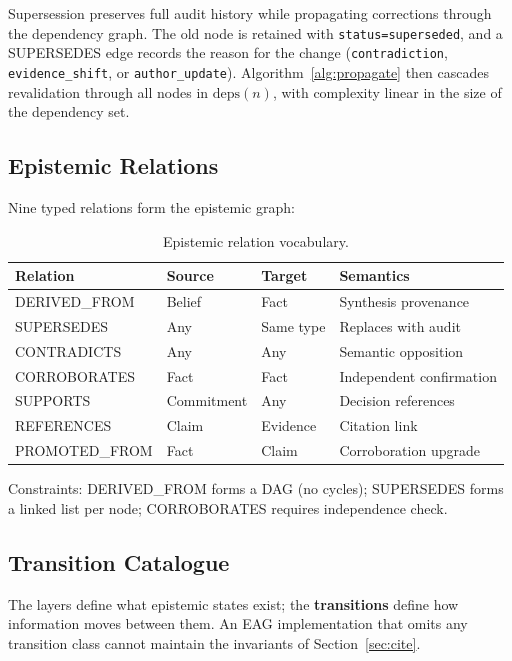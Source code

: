 \documentclass[11pt,letterpaper]{article}
\begin{document}
Supersession preserves full audit history while propagating corrections through the dependency graph. The old node is retained with \texttt{status=superseded}, and a SUPERSEDES edge records the reason for the change (\texttt{contradiction}, \texttt{evidence\_shift}, or \texttt{author\_update}). Algorithm~\ref{alg:propagate} then cascades revalidation through all nodes in $\text{deps}(n)$, with complexity linear in the size of the dependency set.

\subsection{Epistemic Relations}

Nine typed relations form the epistemic graph:

\begin{table}[H]
\centering
\caption{Epistemic relation vocabulary.}
\label{tab:relations}
\begin{tabular}{@{}llll@{}}
\toprule
\textbf{Relation} & \textbf{Source} & \textbf{Target} & \textbf{Semantics} \\
\midrule
DERIVED\_FROM & Belief & Fact & Synthesis provenance \\
SUPERSEDES & Any & Same type & Replaces with audit \\
CONTRADICTS & Any & Any & Semantic opposition \\
CORROBORATES & Fact & Fact & Independent confirmation \\
SUPPORTS & Commitment & Any & Decision references \\
REFERENCES & Claim & Evidence & Citation link \\
PROMOTED\_FROM & Fact & Claim & Corroboration upgrade \\
\bottomrule
\end{tabular}
\end{table}

Constraints: DERIVED\_FROM forms a DAG (no cycles); SUPERSEDES forms a linked list per node; CORROBORATES requires independence check.

\subsection{Transition Catalogue}

The layers define what epistemic states exist; the \textbf{transitions} define how information moves between them. An EAG implementation that omits any transition class cannot maintain the invariants of Section~\ref{sec:cite}.
\end{document}
